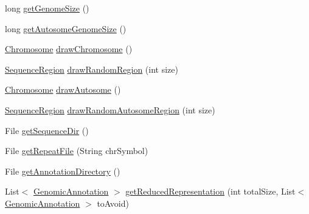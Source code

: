 \begin{DoxyCompactItemize}
\item 
long \hyperlink{classbroad_1_1pda_1_1feature_1_1genome_1_1_directory_installed_genome_assembly_a928bd63f7e8e0fc7ff953346a44410e8}{get\+Genome\+Size} ()
\item 
long \hyperlink{classbroad_1_1pda_1_1feature_1_1genome_1_1_directory_installed_genome_assembly_aef7d0ff9b0a4ecb57110d3a356f517b9}{get\+Autosome\+Genome\+Size} ()
\item 
\hyperlink{classbroad_1_1pda_1_1feature_1_1genome_1_1_chromosome}{Chromosome} \hyperlink{classbroad_1_1pda_1_1feature_1_1genome_1_1_directory_installed_genome_assembly_a61e20cec51563cf0109fd039ac861c3e}{draw\+Chromosome} ()
\item 
\hyperlink{classbroad_1_1core_1_1sequence_1_1_sequence_region}{Sequence\+Region} \hyperlink{classbroad_1_1pda_1_1feature_1_1genome_1_1_directory_installed_genome_assembly_adca92fa4600659ae4239424187d482f5}{draw\+Random\+Region} (int size)
\item 
\hyperlink{classbroad_1_1pda_1_1feature_1_1genome_1_1_chromosome}{Chromosome} \hyperlink{classbroad_1_1pda_1_1feature_1_1genome_1_1_directory_installed_genome_assembly_ab69f195e8dfa718d21863147428bfbdd}{draw\+Autosome} ()
\item 
\hyperlink{classbroad_1_1core_1_1sequence_1_1_sequence_region}{Sequence\+Region} \hyperlink{classbroad_1_1pda_1_1feature_1_1genome_1_1_directory_installed_genome_assembly_a29804a72a54c40725c80bb8d6b358687}{draw\+Random\+Autosome\+Region} (int size)
\item 
File \hyperlink{classbroad_1_1pda_1_1feature_1_1genome_1_1_directory_installed_genome_assembly_aed195a28d47db8336eedf61e0426b6cc}{get\+Sequence\+Dir} ()
\item 
File \hyperlink{classbroad_1_1pda_1_1feature_1_1genome_1_1_directory_installed_genome_assembly_a0c140dd9235aa9464c0ff812d25309a2}{get\+Repeat\+File} (String chr\+Symbol)
\item 
File \hyperlink{classbroad_1_1pda_1_1feature_1_1genome_1_1_directory_installed_genome_assembly_a12c802ee5de2070d4f01fd38ffade65e}{get\+Annotation\+Directory} ()
\item 
List$<$ \hyperlink{interfacebroad_1_1core_1_1annotation_1_1_genomic_annotation}{Genomic\+Annotation} $>$ \hyperlink{classbroad_1_1pda_1_1feature_1_1genome_1_1_directory_installed_genome_assembly_abfa6a7b8afd3f5f5bddb699939db5e28}{get\+Reduced\+Representation} (int total\+Size, List$<$ \hyperlink{interfacebroad_1_1core_1_1annotation_1_1_genomic_annotation}{Genomic\+Annotation} $>$ to\+Avoid)
\item 

\end{DoxyCompactItemize}
